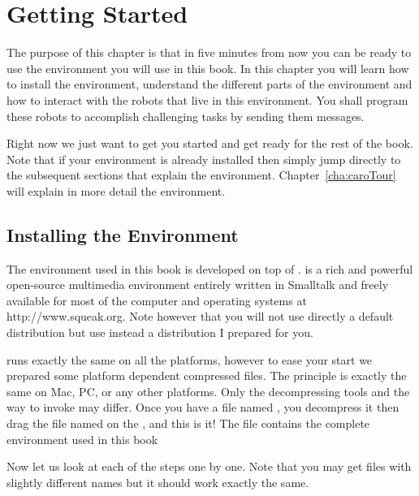 
\ifx\wholebook\relax\else



\fi
	
\chapter{Getting Started}\label{ch:firstcontact}

The purpose of this chapter is that in five minutes from now you can be ready to use the environment you will use in this book. In this chapter you will learn how to install the  environment, understand the different parts of the environment and how to interact with the robots that live in this environment. You shall program these robots to accomplish challenging tasks by sending them messages.

Right now we just want to get you started and get ready for the rest of the book.   Note that if your environment is already installed then simply jump directly to the subsequent sections that explain the environment. Chapter~\ref{cha:caroTour} will explain in more detail the environment. 


\section{Installing the Environment}
The environment used in this book is developed on top of \sq. \sq is a rich and powerful open-source multimedia environment entirely written in Smalltalk and freely available for most of the computer and operating systems at http://www.\-squeak.\-org. Note however that you will not use directly a default  \sq distribution but use instead a distribution I prepared for you.  

\sq runs exactly the same on all the platforms, however to ease your start we prepared some platform dependent compressed files. The principle is exactly the same on Mac, PC, or any other platforms. Only the decompressing tools and the way to invoke \sq may differ. Once you have a file named , you decompress it then drag the file named  on the , and this is it! The file  contains the complete environment used in this book

Now let us look at each of the steps one by one. Note that you may get files with slightly different names but it should work exactly the same.

